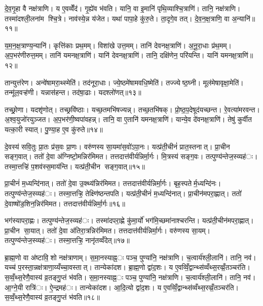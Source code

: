 दे॒व॒गृ॒हा वै नक्ष॑त्राणि। य ए॒वव्वेँद॑। गृ॒ह्ये॑व भ॑वति। यानि॒ वा इ॒मानि॑ पृथि॒व्याश्चि॒त्राणि॑। तानि॒ नक्ष॑त्राणि। तस्मा॑दश्ली॒लना॑म श्चि॒त्रे। नाव॑स्ये॒न्न य॑जेत। यथा॑ पापा॒हे कु॑रु॒ते। ता॒दृगे॒व तत्। दे॒व॒न॒क्ष॒त्राणि॒ वा अ॒न्यानि॑॥११॥

य॒म॒न॒क्ष॒त्राण्य॒न्यानि॑। कृत्ति॑काः प्रथ॒मम्। विशा॑खे उत्त॒मम्। तानि॑ देवनक्ष॒त्राणि॑। अ॒नू॒रा॒धाः प्र॑थ॒मम्। अ॒प॒भर॑णीरुत्त॒मम्। तानि॑ यमनक्ष॒त्राणि॑। यानि॑ देवनक्ष॒त्राणि॑। तानि॒ दक्षि॑णेन॒ परि॑यन्ति। यानि॑ यमनक्ष॒त्राणि॑॥१२॥

तान्युत्त॑रेण। अन्वे॑षामरा॒थ्स्मेति॑। तद॑नूरा॒धाः। ज्ये॒ष्ठमे॑षामवधि॒ष्मेति॑। तज्ज्येष्ठ॒घ्नी। मूल॑मेषावृक्षा॒मेति॑। तन्मू॑ल॒वऱ्ह॑णी। यन्नास॑हन्त। तद॑षा॒ढाः। यदश्लो॑णत्॥१३॥

तच्छ्रो॒णा। यदशृ॑णोत्। तच्छ्रवि॑ष्ठाः। यच्छ॒तमभि॑षज्यन्न्। तच्छ॒तभि॑षक्। प्रो॒ष्ठ॒प॒देषूद॑यच्छन्त। रे॒वत्या॑मरवन्त। अ॒श्व॒युजो॑रयुञ्जत। अ॒प॒भर॑णी॒ष्वपा॑वहन्न्। तानि॒ वा ए॒तानि॑ यमनक्ष॒त्राणि॑। यान्ये॒व दे॑वनक्ष॒त्राणि॑। तेषु॑ कुर्वीत यत्का॒री स्यात्। पु॒ण्या॒ह ए॒व कु॑रुते॥१४॥


दे॒वस्य॑ सवि॒तुः प्रा॒तः प्र॑स॒वः प्रा॒णः। वरु॑णस्य सा॒यमा॑स॒वो॑ऽपा॒नः। यत्प्र॑ती॒चीनं॑ प्रात॒स्तनात्। प्रा॒चीन सङ्ग॒वात्। ततो॑ दे॒वा अ॑ग्निष्टो॒मन्निर॑मिमत। तत्तदात्त॑वीर्यन्निर्मा॒र्गः। मि॒त्रस्य॑ सङ्ग॒वः। तत्पुण्य॑न्तेज॒स्व्यह॑ः। तस्मा॒त्तऱ्हि॑ प॒शव॑स्स॒माय॑न्ति। यत्प्र॑ती॒चीन सङ्ग॒वात्॥१५॥

प्रा॒चीनं॑ म॒ध्यन्दि॑नात्। ततो॑ दे॒वा उ॒क्थ्य॑न्निर॑मिमत। तत्तदात्त॑वीर्यन्निर्मा॒र्गः। बृह॒स्पतेर्म॒ध्यन्दि॑नः। तत्पुण्य॑न्तेज॒स्व्यह॑ः। तस्मा॒त्तऱ्हि॒ तेक्ष्णि॑ष्ठन्तपति। यत्प्र॑ती॒चीनं॑ म॒ध्यन्दि॑नात्। प्रा॒चीन॑मपरा॒ह्णात्। ततो॑ दे॒वाष्षो॑ड॒शिन॒न्निर॑मिमत। तत्तदात्त॑वीर्यन्निर्मा॒र्गः॥१६॥

भग॑स्यापरा॒ह्णः। तत्पुण्य॑न्तेज॒स्व्यह॑ः। तस्मा॑दपरा॒ह्णे कु॑मा॒र्यो॑ भग॑मि॒च्छमा॑नाश्चरन्ति। यत्प्र॑ती॒चीन॑मपरा॒ह्णात्। प्रा॒चीन सा॒यात्। ततो॑ दे॒वा अ॑तिरा॒त्रन्निर॑मिमत। तत्तदात्त॑वीर्यन्निर्मा॒र्गः। वरु॑णस्य सा॒यम्। तत्पुण्य॑न्तेज॒स्व्यह॑ः। तस्मा॒त्तऱ्हि॒ नानृ॑तव्वँदेत्॥१७॥

ब्रा॒ह्म॒णो वा अ॑ष्टावि॒शो नक्ष॑त्राणाम्। स॒मा॒नस्याह्न॒ः पञ्च॒ पुण्या॑नि॒ नक्ष॑त्राणि। च॒त्वार्य॑श्ली॒लानि॑। तानि॒ नव॑। यच्च॑ प॒रस्ता॒न्नक्ष॑त्राणा॒य्यँच्चा॒वस्तात्। तान्येका॑दश। ब्रा॒ह्म॒णो द्वा॑द॒शः। य ए॒वव्विँ॒द्वान्थ्स॑व्वँथ्स॒रव्व्रँ॒तञ्चर॑ति। स॒व्वँ॒थ्स॒रेणै॒वास्य॑ व्र॒तङ्गु॒प्तं भ॑वति। स॒मा॒नस्याह्न॒ः पञ्च॒ पुण्या॑नि॒ नक्ष॑त्राणि। च॒त्वार्य॑श्ली॒लानि॑। तानि॒ नव॑। आ॒ग्ने॒यी रात्रि॑ः। ऐ॒न्द्रमह॑ः। तान्येका॑दश। आ॒दि॒त्यो द्वा॑द॒शः। य ए॒वव्विँ॒द्वान्थ्स॑व्वँथ्स॒रव्व्रँ॒तञ्चर॑ति। स॒व्वँ॒थ्स॒रेणै॒वास्य॑ व्र॒तङ्गु॒प्तं भ॑वति॥१८॥


